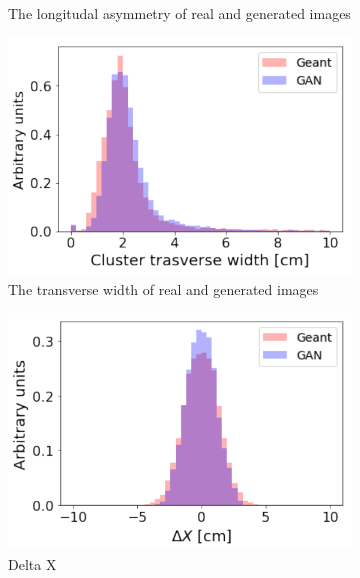 \documentclass{webofc}
\begin{document}
\begin{figure}
\begin{subfigure}{0.19\textwidth}
    \caption{The longitudal asymmetry of real and generated images}
  \end{subfigure}
  \begin{subfigure}{0.19\textwidth}
    \centering
    \includegraphics[width=1\textwidth]{figures/width.pdf}
    \caption{The transverse width of real and generated images}
  \end{subfigure}
  \begin{subfigure}{0.19\textwidth}
    \centering
    \includegraphics[width=1\textwidth]{figures/deltaX.pdf}
    \caption{Delta X}
  \end{subfigure}
  \begin{subfigure}{0.19\textwidth}
    \centering

\end{subfigure}
\end{figure}
\end{document}
